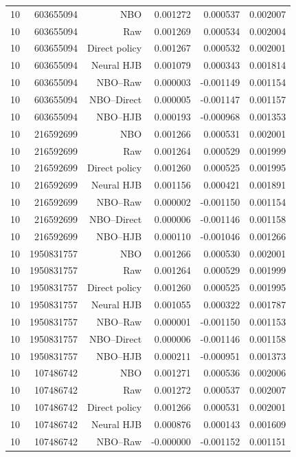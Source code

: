 \begin{longtable}{lrrrrr}
10 & 603655094 & NBO & 0.001272 & 0.000537 & 0.002007 \\
10 & 603655094 & Raw & 0.001269 & 0.000534 & 0.002004 \\
10 & 603655094 & Direct policy & 0.001267 & 0.000532 & 0.002001 \\
10 & 603655094 & Neural HJB & 0.001079 & 0.000343 & 0.001814 \\
10 & 603655094 & NBO--Raw & 0.000003 & -0.001149 & 0.001154 \\
10 & 603655094 & NBO--Direct & 0.000005 & -0.001147 & 0.001157 \\
10 & 603655094 & NBO--HJB & 0.000193 & -0.000968 & 0.001353 \\
10 & 216592699 & NBO & 0.001266 & 0.000531 & 0.002001 \\
10 & 216592699 & Raw & 0.001264 & 0.000529 & 0.001999 \\
10 & 216592699 & Direct policy & 0.001260 & 0.000525 & 0.001995 \\
10 & 216592699 & Neural HJB & 0.001156 & 0.000421 & 0.001891 \\
10 & 216592699 & NBO--Raw & 0.000002 & -0.001150 & 0.001154 \\
10 & 216592699 & NBO--Direct & 0.000006 & -0.001146 & 0.001158 \\
10 & 216592699 & NBO--HJB & 0.000110 & -0.001046 & 0.001266 \\
10 & 1950831757 & NBO & 0.001266 & 0.000530 & 0.002001 \\
10 & 1950831757 & Raw & 0.001264 & 0.000529 & 0.001999 \\
10 & 1950831757 & Direct policy & 0.001260 & 0.000525 & 0.001995 \\
10 & 1950831757 & Neural HJB & 0.001055 & 0.000322 & 0.001787 \\
10 & 1950831757 & NBO--Raw & 0.000001 & -0.001150 & 0.001153 \\
10 & 1950831757 & NBO--Direct & 0.000006 & -0.001146 & 0.001158 \\
10 & 1950831757 & NBO--HJB & 0.000211 & -0.000951 & 0.001373 \\
10 & 107486742 & NBO & 0.001271 & 0.000536 & 0.002006 \\
10 & 107486742 & Raw & 0.001272 & 0.000537 & 0.002007 \\
10 & 107486742 & Direct policy & 0.001266 & 0.000531 & 0.002001 \\
10 & 107486742 & Neural HJB & 0.000876 & 0.000143 & 0.001609 \\
10 & 107486742 & NBO--Raw & -0.000000 & -0.001152 & 0.001151 \\

\end{longtable}
